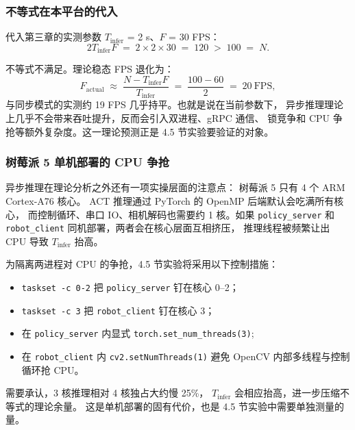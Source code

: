 \subsubsection{不等式在本平台的代入}\label{sec:async-inf-substitute}

代入第三章的实测参数 $T_{\text{infer}}$ = 2 s、$F$ = 30 FPS：
\begin{equation}
  2 T_{\text{infer}} F \;=\; 2 \times 2 \times 30 \;=\; 120 \;>\; 100 \;=\; N.
\end{equation}

不等式不满足。理论稳态 FPS 退化为：
\begin{equation}
  F_{\text{actual}} \;\approx\; \frac{N - T_{\text{infer}} F}{T_{\text{infer}}}
  \;=\; \frac{100 - 60}{2} \;=\; 20\ \text{FPS},
\end{equation}
与同步模式的实测约 19 FPS 几乎持平。也就是说在当前参数下，
异步推理理论上几乎不会带来吞吐提升，反而会引入双进程、gRPC 通信、
锁竞争和 CPU 争抢等额外复杂度。这一理论预测正是 4.5 节实验要验证的对象。

\subsubsection{树莓派 5 单机部署的 CPU 争抢}\label{sec:async-inf-cpu-contention}

异步推理在理论分析之外还有一项实操层面的注意点：
树莓派 5 只有 4 个 ARM Cortex-A76 核心。
ACT 推理通过 PyTorch 的 OpenMP 后端默认会吃满所有核心，
而控制循环、串口 IO、相机解码也需要约 1 核。如果 \texttt{policy\_server}
和 \texttt{robot\_client} 同机部署，两者会在核心层面互相挤压，
推理线程被频繁让出 CPU 导致 $T_{\text{infer}}$ 抬高。

为隔离两进程对 CPU 的争抢，4.5 节实验将采用以下控制措施：
\begin{itemize}[leftmargin=2em]
  \item \texttt{taskset -c 0-2} 把 \texttt{policy\_server} 钉在核心 0--2；
  \item \texttt{taskset -c 3} 把 \texttt{robot\_client} 钉在核心 3；
  \item 在 \texttt{policy\_server} 内显式 \texttt{torch.set\_num\_threads(3)};
  \item 在 \texttt{robot\_client} 内 \texttt{cv2.setNumThreads(1)}
        避免 OpenCV 内部多线程与控制循环抢 CPU。
\end{itemize}

需要承认，3 核推理相对 4 核独占大约慢 25\%，
$T_{\text{infer}}$ 会相应抬高，进一步压缩不等式的理论余量。
这是单机部署的固有代价，也是 4.5 节实验中需要单独测量的量。

